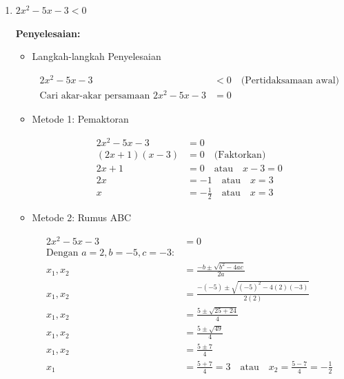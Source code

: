 \documentclass{article}
\begin{document}
\begin{enumerate}
\begin{itemize}
\begin{center}
\begin{tikzpicture}[scale=0.8]
    \end{tikzpicture}
    \end{center}
    
    \item HP: $\left(-\frac{1}{2}, \frac{2}{3}\right]$
    \end{itemize}
    
    \item $2x^{2}-5x-3 < 0$
    
    \textbf{Penyelesaian:}
    
    \begin{itemize}
    \item Langkah-langkah Penyelesaian
    
    \begin{align}
    2x^2 - 5x - 3 &< 0 \quad \text{(Pertidaksamaan awal)} \\
    \text{Cari akar-akar persamaan } 2x^2 - 5x - 3 &= 0
    \end{align}
    
    \item Metode 1: Pemaktoran
    
    \begin{align}
    2x^2 - 5x - 3 &= 0 \\
    (2x + 1)(x - 3) &= 0 \quad \text{(Faktorkan)} \\
    2x + 1 &= 0 \quad \text{atau} \quad x - 3 = 0 \\
    2x &= -1 \quad \text{atau} \quad x = 3 \\
    x &= -\frac{1}{2} \quad \text{atau} \quad x = 3
    \end{align}
    
    \item Metode 2: Rumus ABC
    
    \begin{align}
    2x^2 - 5x - 3 &= 0 \\
    \text{Dengan } a = 2, b = -5, c = -3: & \\
    x_1,x_2 &= \frac{-b \pm \sqrt{b^2 - 4ac}}{2a} \\
    x_1,x_2 &= \frac{-(-5) \pm \sqrt{(-5)^2 - 4(2)(-3)}}{2(2)} \\
    x_1,x_2 &= \frac{5 \pm \sqrt{25 + 24}}{4} \\
    x_1,x_2 &= \frac{5 \pm \sqrt{49}}{4} \\
    x_1,x_2 &= \frac{5 \pm 7}{4} \\
    x_1 &= \frac{5 + 7}{4} = 3 \quad \text{atau} \quad x_2 = \frac{5 - 7}{4} = -\frac{1}{2}
    \end{align}
    

\end{itemize}
\end{enumerate}
\end{document}
